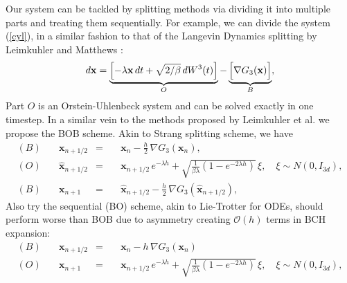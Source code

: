 \documentclass{article}
\renewcommand{\vec}[1]{{\mathbf{#1}}}
\begin{document}
Our system can be tackled by splitting methods via dividing it into multiple parts and treating them sequentially. For example, we can divide the system (\ref{cyl}), in a similar fashion to that of the Langevin Dynamics splitting by Leimkuhler and Matthews \cite{leimkuhler_baoab}:
\begin{equation}  
 \begin{aligned}
 d\vec x= \underbrace{\Bigl[-\lambda \vec x \,dt +\sqrt{2/\beta}\, dW^3(t) \Bigr]}_{O} - \underbrace{\Bigl[ \nabla G_{3}(\vec x)\Bigr]}_{B},
  \end{aligned}\label{cyl_split}
\end{equation}
Part $O$ is an Orstein-Uhlenbeck system and can be solved exactly in one timestep. In a similar vein to the methods proposed by Leimkuhler et al. we propose the BOB scheme. Akin to Strang splitting scheme, we have
\begin{equation} 
\begin{aligned} 
(B) \quad &\vec x_{n+1/2}&=&\quad \vec x_{n} - \frac{h}{2}\,\nabla G_{3}(\vec x_n),\\
(O) \quad &\hat{\vec x}_{n+1/2} &=&\quad \vec x_{n+1/2}\, e^{-\lambda h} + \sqrt{\frac{1}{\beta\lambda} \left(1-e^{-2\lambda  h} \right)}\, \xi, \quad \xi \sim N(0,I_{3d}), \\
(B) \quad &\vec x_{n+1}&=&\quad \hat{\vec x}_{n+1/2} - \frac{h}{2}\,\nabla G_{3}(\hat{\vec x}_{n+1/2}),
\label{bob_split}
\end{aligned}
\end{equation}
Also try the sequential (BO) scheme, akin to Lie-Trotter for ODEs, should perform worse than BOB due to asymmetry creating $\mathcal{O}(h)$ terms in BCH expansion:
\begin{equation} 
\begin{aligned} 
(B) \quad &\vec x_{n+1/2}&=& \quad \vec x_{n} - h\,\nabla G_{3}(\vec x_n)\\
(O) \quad &\vec x_{n+1} &=& \quad \vec x_{n+1/2}\, e^{-\lambda h} + \sqrt{\frac{1}{\beta\lambda} \left(1-e^{-2\lambda  h} \right)}\, \xi, \quad \xi \sim N(0,I_{3d}),
\label{seq_split}
\end{aligned}
\end{equation}
\end{document}
